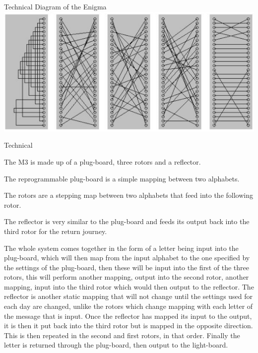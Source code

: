 \documentclass[final]{beamer}
\begin{document}
\begin{frame}{}
\begin{columns}[t]
\begin{column}{.32\linewidth}
        \begin{block}{Technical Diagram of the Enigma}
          \includegraphics[width=\columnwidth]{enigma.png} 
        \end{block}
        
         \begin{block}{Technical}
          \begin{itemize} \small{
          \item The M3 is made up of a plug-board, three rotors and a reflector.
          \item The reprogrammable plug-board is a simple mapping between two alphabets.
          \item The rotors are a stepping map between two alphabets that feed into the following rotor.
          \item The reflector is very similar to the plug-board and feeds its output back into the third rotor for the return journey.
          \item The whole system comes together in the form of a letter being input into the plug-board, which will then map from the input alphabet to the one specified by the settings of the plug-board, then these will be input into the first of the three rotors, this will perform another mapping, output into the second rotor, another mapping, input into the third rotor which would then output to the reflector. The reflector is another static mapping that will not change until the settings used for each day are changed, unlike the rotors which change mapping with each letter of the message that is input. Once the reflector has mapped its input to the output, it is then it put back into the third rotor but is mapped in the opposite direction. This is then repeated in the second and first rotors, in that order. Finally the letter is returned through the plug-board, then output to the light-board.}
          \end{itemize}
        \end{block}


\end{column}
\end{columns}
\end{frame}
\end{document}
